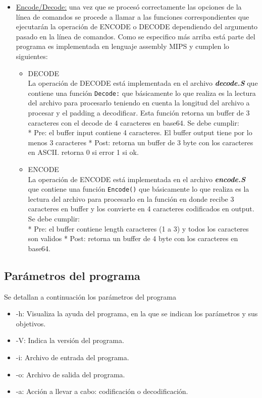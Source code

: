 \documentclass[11pt,a4paper]{article}
\begin{document}
\begin{itemize}
	\item \underline{Encode/Decode:} una vez que se procesó correctamente las opciones de la línea de comandos se procede a llamar a las funciones correspondientes que ejecutarán la operación de ENCODE o DECODE dependiendo del argumento pasado en la línea de comandos. Como se especifico más arriba está parte del programa es implementada en lenguaje assembly MIPS y cumplen lo siguientes:
\begin{itemize}
	\item{DECODE}\\
La operación de DECODE está implementada en el archivo \textit{\textbf{decode.S}} que contiene una función
\texttt{Decode:} que básicamente lo que realiza es la lectura del archivo para procesarlo teniendo en cuenta la longitud del archivo a procesar y el padding a decodificar. Esta función retorna un buffer de 3 caracteres con el decode de 4 caracteres en base64. Se debe cumplir:\\

 * Pre: el buffer input contiene 4 caracteres. El buffer output tiene por lo menos 3 caracteres
 * Post: retorna un buffer de 3 byte con los caracteres en ASCII. retorna 0 si error 1 si ok.

	\item{ENCODE}\\
La operación de ENCODE está implementada en el archivo \textit{\textbf{encode.S}} que contiene una función
\texttt{Encode()} que básicamente lo que realiza es la lectura del archivo para procesarlo en la función  en donde recibe 3 caracteres en buffer y los convierte en 4 caracteres codificados en output. Se debe cumplir:\\

 * Pre: el buffer contiene length caracteres (1 a 3) y todos los caracteres son validos
 * Post: retorna un buffer de 4 byte con los caracteres en base64.
	\end{itemize}

	\end{itemize}


\subsection{Parámetros del programa}

Se detallan a continuación los parámetros del programa

\begin{itemize}
    \item -h: Visualiza la ayuda del programa, en la que se indican los parámetros y sus objetivos.
    \item -V: Indica la versión del programa.
    \item -i: Archivo de entrada del programa.
    \item -o: Archivo de salida del programa.
    \item -a: Acción a llevar a cabo: codificación o decodificación.
\end{itemize}
\end{document}
